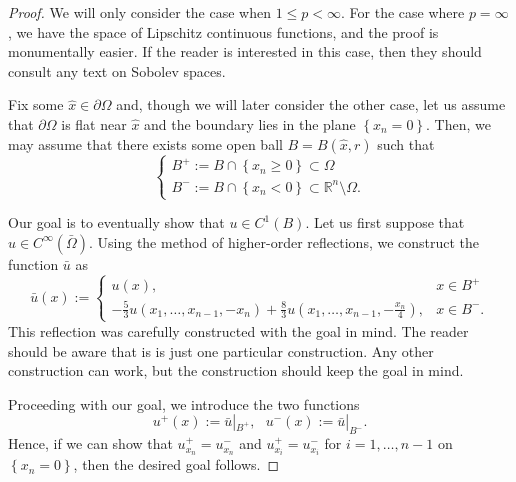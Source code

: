 \documentclass[10pt]{article}
\begin{document}
\begin{proof}
	We will only consider the case when $1 \leq p < \infty$. For the case where $p = \infty$, we have the space of Lipschitz continuous functions, and the proof is monumentally easier. If the reader is interested in this case, then they should consult any text on Sobolev spaces. 
	
	Fix some $\hat{x} \in \partial \Omega$ and, though we will later consider the other case, let us assume that $\partial \Omega$ is flat near $\hat{x}$ and the boundary lies in the plane $\left\{x_n = 0\right\}$. Then, we may assume that there exists some open ball $B = B(\hat{x},r)$ such that 
	\begin{equation*}
		\displaystyle \begin{cases}
			B^+ := B\cap\left\{x_n \geq 0 \right\} \subset \Omega \\
			B^- := B\cap\left\{x_n < 0 \right\} \subset \mathbb{R}^n \setminus \Omega. 
		\end{cases}
	\end{equation*}
	
	Our goal is to eventually show that $u \in C^1(B)$. Let us first suppose that $u \in C^\infty(\bar{\Omega})$. Using the method of higher-order reflections, we construct the function $\bar{u}$ as 
	\begin{equation*}
		\displaystyle \bar{u}(x) := \begin{cases}
			u(x), & x \in B^+ \\
			-\frac{5}{3}u(x_1,\dots,x_{n-1},-x_n) + \frac{8}{3}u(x_1,\dots,x_{n-1},-\frac{x_{n}}{4}), & x \in B^-.
		\end{cases}
	\end{equation*}
	This reflection was carefully constructed with the goal in mind. The reader should be aware that is is just one particular construction. Any other construction can work, but the construction should keep the goal in mind. 
	
	Proceeding with our goal, we introduce the two functions 
	\begin{equation*}
		\displaystyle u^+(x) := \bar{u}|_{B^+}, \:\:\: u^-(x) := \bar{u}|_{B^-}.
	\end{equation*}
	Hence, if we can show that $u^+_{x_n} = u^-_{x_n}$ and $u^+_{x_i} = u^-_{x_i}$ for $i = 1,\dots,n-1$ on $\left\{ x_n = 0 \right\}$, then the desired goal follows. 
	

\end{proof}
\end{document}
